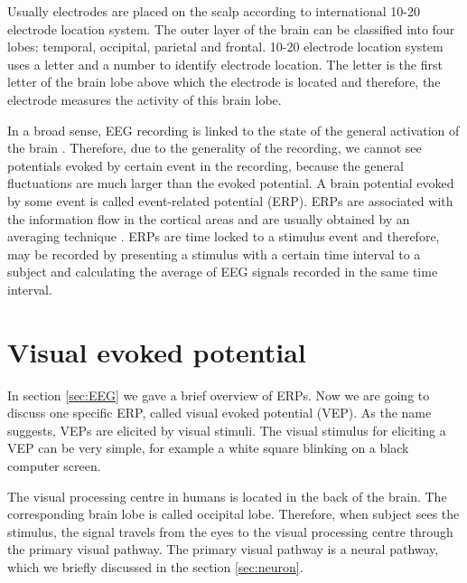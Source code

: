 Usually electrodes are placed on the scalp according to international 10-20 electrode location system. The outer layer of the brain can be classified into four lobes: temporal, occipital, parietal and frontal. 10-20 electrode location system uses a letter and a number to identify electrode location. The letter is the first letter of the brain lobe above which the electrode is located and therefore, the electrode measures the activity of this brain lobe.

In a broad sense, \acrshort{EEG} recording is linked to the state of the general activation of the brain \cite{VEP}. Therefore, due to the generality of the recording, we cannot see potentials evoked by certain event in the recording, because the general fluctuations are much larger than the evoked potential. A brain potential evoked by some event is called event-related potential (ERP). ERPs are associated with the information flow in the cortical areas and are usually obtained by an averaging technique \cite{ERP}. ERPs are time locked to a stimulus event and therefore, may be recorded by presenting a stimulus with a certain time interval to a subject and calculating the average of EEG signals recorded in the same time interval.
\section{Visual evoked potential}

In section \ref{sec:EEG} we gave a brief overview of ERPs. Now we are going to discuss one specific ERP, called visual evoked potential (VEP). As the name suggests, VEPs are elicited by visual stimuli. The visual stimulus for eliciting a VEP can be very simple, for example a white square blinking on a black computer screen.

The visual processing centre in humans is located in the back of the brain. The corresponding brain lobe is called occipital lobe. Therefore, when subject sees the stimulus, the signal travels from the eyes to the visual processing centre through the primary visual pathway. The primary visual pathway is a neural pathway, which we briefly discussed in the section \ref{sec:neuron}.


